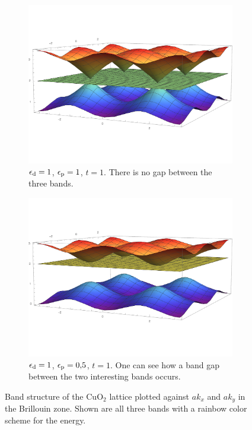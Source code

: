 \documentclass[11pt, english, fleqn, DIV=15, headinclude, BCOR=1cm]{scrartcl}
\begin{document}
\begin{figure}
    \centering
    \begin{subfigure}[t]{0.48\linewidth}
        \centering
        \includegraphics[width=\linewidth]{1_1_1.pdf}
        \caption{%
            $\epsilon_\mathrm d = \num{1}$,
            $\epsilon_\mathrm p = \num{1}$,
            $t = \num{1}$. There is no gap between the three bands.
        }
        \label{fig:eigenvalues/1}
    \end{subfigure}
    \hfill
    \begin{subfigure}[t]{0.48\linewidth}
        \centering
        \includegraphics[width=\linewidth]{05_1_1.pdf}
        \caption{%
            $\epsilon_\mathrm d = \num{1}$,
            $\epsilon_\mathrm p = \num{0.5}$,
            $t = \num{1}$. One can see how a band gap between the two
            interesting bands occurs.
        }
        \label{fig:eigenvalues/2}
    \end{subfigure}
    \caption{%
        Band structure of the $\mathrm{CuO_2}$ lattice plotted against $a k_x$
        and $a k_y$ in the Brillouin zone. Shown are all three bands with a
        rainbow color scheme for the energy.
    }
    \label{fig:eigenvalues}
\end{figure}
\end{document}

